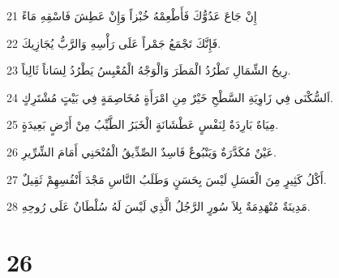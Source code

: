 \par 21 إِنْ جَاعَ عَدُوُّكَ فَأَطْعِمْهُ خُبْزاً وَإِنْ عَطِشَ فَاسْقِهِ مَاءً
\par 22 فَإِنَّكَ تَجْمَعُ جَمْراً عَلَى رَأْسِهِ وَالرَّبُّ يُجَازِيكَ.
\par 23 رِيحُ الشِّمَالِ تَطْرُدُ الْمَطَرَ وَالْوَجْهُ الْمُعْبِسُ يَطْرُدُ لِسَاناً ثَالِباً.
\par 24 اَلسُّكْنَى فِي زَاوِيَةِ السَّطْحِ خَيْرٌ مِنِ امْرَأَةٍ مُخَاصِمَةٍ فِي بَيْتٍ مُشْتَرِكٍ.
\par 25 مِيَاهٌ بَارِدَةٌ لِنَفْسٍ عَطْشَانَةٍ الْخَبَرُ الطَّيِّبُ مِنْ أَرْضٍ بَعِيدَةٍ.
\par 26 عَيْنٌ مُكَدَّرَةٌ وَيَنْبُوعٌ فَاسِدٌ الصِّدِّيقُ الْمُنْحَنِي أَمَامَ الشِّرِّيرِ.
\par 27 أَكْلُ كَثِيرٍ مِنَ الْعَسَلِ لَيْسَ بِحَسَنٍ وَطَلَبُ النَّاسِ مَجْدَ أَنْفُسِهِمْ ثَقِيلٌ.
\par 28 مَدِينَةٌ مُنْهَدِمَةٌ بِلاَ سُورٍ الرَّجُلُ الَّذِي لَيْسَ لَهُ سُلْطَانٌ عَلَى رُوحِهِ.

\chapter{26}

